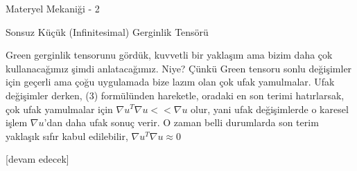 \documentclass[12pt,fleqn]{article}\usepackage{../../common}
\begin{document}
Materyel Mekaniği - 2

Sonsuz Küçük (Infinitesimal) Gerginlik Tensörü

Green gerginlik tensorunu gördük, kuvvetli bir yaklaşım ama bizim daha çok
kullanacağımız şimdi anlatacağımız. Niye? Çünkü Green tensoru sonlu değişimler
için geçerli ama çoğu uygulamada bize lazım olan çok ufak yamulmalar. Ufak
değişimler derken, (3) formülünden hareketle, oradaki en son terimi hatırlarsak,
çok ufak yamulmalar için $\nabla u^T \nabla u << \nabla u$ olur, yani ufak
değişimlerde o karesel işlem $\nabla u$'dan daha ufak sonuç verir. O zaman belli
durumlarda son terim yaklaşık sıfır kabul edilebilir, $\nabla u^T \nabla u
\approx 0$










[devam edecek]
\end{document}
